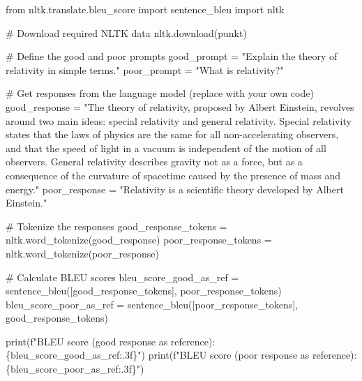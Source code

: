 \documentclass[
]{agujournal2019}
\newenvironment{Shaded}{\begin{snugshade}}{\end{snugshade}}
\newcommand{\BuiltInTok}[1]{\textcolor[rgb]{0.00,0.23,0.31}{#1}}
\newcommand{\CommentTok}[1]{\textcolor[rgb]{0.37,0.37,0.37}{#1}}
\newcommand{\ImportTok}[1]{\textcolor[rgb]{0.00,0.46,0.62}{#1}}
\newcommand{\NormalTok}[1]{\textcolor[rgb]{0.00,0.23,0.31}{#1}}
\newcommand{\OperatorTok}[1]{\textcolor[rgb]{0.37,0.37,0.37}{#1}}
\newcommand{\SpecialCharTok}[1]{\textcolor[rgb]{0.37,0.37,0.37}{#1}}
\newcommand{\SpecialStringTok}[1]{\textcolor[rgb]{0.13,0.47,0.30}{#1}}
\newcommand{\StringTok}[1]{\textcolor[rgb]{0.13,0.47,0.30}{#1}}
\begin{document}
\begin{Shaded}
\begin{Highlighting}[]
\ImportTok{from}\NormalTok{ nltk.translate.bleu\_score }\ImportTok{import}\NormalTok{ sentence\_bleu}
\ImportTok{import}\NormalTok{ nltk}

\CommentTok{\# Download required NLTK data}
\NormalTok{nltk.download(}\StringTok{\textquotesingle{}punkt\textquotesingle{}}\NormalTok{)}

\CommentTok{\# Define the good and poor prompts}
\NormalTok{good\_prompt }\OperatorTok{=} \StringTok{"Explain the theory of relativity in simple terms."}
\NormalTok{poor\_prompt }\OperatorTok{=} \StringTok{"What is relativity?"}

\CommentTok{\# Get responses from the language model (replace with your own code)}
\NormalTok{good\_response }\OperatorTok{=} \StringTok{"The theory of relativity, proposed by Albert Einstein, revolves around two main ideas: special relativity and general relativity. Special relativity states that the laws of physics are the same for all non{-}accelerating observers, and that the speed of light in a vacuum is independent of the motion of all observers. General relativity describes gravity not as a force, but as a consequence of the curvature of spacetime caused by the presence of mass and energy."}
\NormalTok{poor\_response }\OperatorTok{=} \StringTok{"Relativity is a scientific theory developed by Albert Einstein."}

\CommentTok{\# Tokenize the responses}
\NormalTok{good\_response\_tokens }\OperatorTok{=}\NormalTok{ nltk.word\_tokenize(good\_response)}
\NormalTok{poor\_response\_tokens }\OperatorTok{=}\NormalTok{ nltk.word\_tokenize(poor\_response)}

\CommentTok{\# Calculate BLEU scores}
\NormalTok{bleu\_score\_good\_as\_ref }\OperatorTok{=}\NormalTok{ sentence\_bleu([good\_response\_tokens], poor\_response\_tokens)}
\NormalTok{bleu\_score\_poor\_as\_ref }\OperatorTok{=}\NormalTok{ sentence\_bleu([poor\_response\_tokens], good\_response\_tokens)}

\BuiltInTok{print}\NormalTok{(}\SpecialStringTok{f"BLEU score (good response as reference): }\SpecialCharTok{\{}\NormalTok{bleu\_score\_good\_as\_ref}\SpecialCharTok{:.3f\}}\SpecialStringTok{"}\NormalTok{)}
\BuiltInTok{print}\NormalTok{(}\SpecialStringTok{f"BLEU score (poor response as reference): }\SpecialCharTok{\{}\NormalTok{bleu\_score\_poor\_as\_ref}\SpecialCharTok{:.3f\}}\SpecialStringTok{"}\NormalTok{)}
\end{Highlighting}
\end{Shaded}
\end{document}
